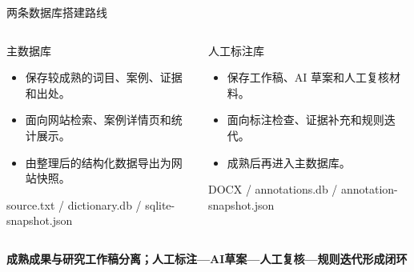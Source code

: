 \documentclass[aspectratio=169]{beamer}
\newcommand{\key}[1]{\textcolor{rucRed}{\textbf{#1}}}
\begin{document}
\begin{frame}{两条数据库搭建路线}
    \begin{columns}[T]
            \begin{exampleblock}{主数据库}
                \begin{itemize}
                    \item 保存较成熟的词目、案例、证据和出处。
                    \item 面向网站检索、案例详情页和统计展示。
                    \item 由整理后的结构化数据导出为网站快照。
                \end{itemize}
                \vspace{0.12cm}
                \centering
                {\scriptsize source.txt / dictionary.db / sqlite-snapshot.json}
            \end{exampleblock}
            \begin{exampleblock}{人工标注库}
                \begin{itemize}
                    \item 保存工作稿、AI 草案和人工复核材料。
                    \item 面向标注检查、证据补充和规则迭代。
                    \item 成熟后再进入主数据库。
                \end{itemize}
                \vspace{0.12cm}
                \centering
                {\scriptsize DOCX / annotations.db / annotation-snapshot.json}
            \end{exampleblock}
    \end{columns}
    \vspace{0.25cm}
    \begin{center}
        \key{成熟成果与研究工作稿分离；人工标注—AI草案—人工复核—规则迭代形成闭环}
    \end{center}
\end{frame}
\end{document}
